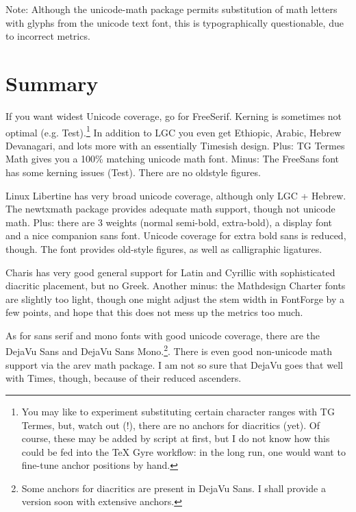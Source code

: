 \documentclass[12pt,a4paper]{article}
\begin{document}
\begin{itemize}
\end{itemize}

Note: Although the unicode-math package permits substitution of math
letters with glyphs from the unicode text font, this is
typographically questionable, due to incorrect metrics.   


\section{Summary}

If you want widest Unicode coverage, go for FreeSerif. Kerning is
sometimes not optimal (e.g. Test).\footnote{You may like to experiment
substituting certain character ranges with TG Termes, but, watch out
(!), there are no anchors for diacritics (yet). Of course, these may
be added by script at first, but I do not know how this could be fed into the
TeX Gyre workflow: in the long run, one would want to fine-tune anchor
positions by hand.}  
In addition to LGC you even get Ethiopic, Arabic, Hebrew
Devanagari, and lots more with an essentially Timesish design. Plus:
TG Termes Math gives you a 100\% matching unicode math font. Minus:
The FreeSans font has some kerning issues (\textsf{Test}). There are
no oldstyle figures.   

Linux Libertine has very broad unicode coverage, although only LGC +
Hebrew. The newtxmath package provides adequate math support, though not
unicode math. Plus: there are 3 weights (normal semi-bold, extra-bold),
 a display font and a nice companion sans font. Unicode coverage for
 extra bold sans is reduced, though. The font provides old-style
 figures, as well as calligraphic ligatures.  

Charis has very good general support for Latin and Cyrillic with
sophisticated diacritic placement, but no Greek. Another minus:
the Mathdesign Charter fonts are slightly too light, though one might
adjust the stem width in FontForge by a few points, and hope that this
does not mess up the metrics too much. 



As for sans serif and mono fonts with good unicode coverage, there are
the DejaVu Sans and DejaVu Sans Mono.\footnote{Some anchors for
  diacritics are present in DejaVu Sans. I shall provide a version
  soon with extensive anchors.}. There is even good
non-unicode math support via the arev math package. I am not so sure
that DejaVu goes that well with Times, though, because of their
reduced ascenders. 
\end{document}

